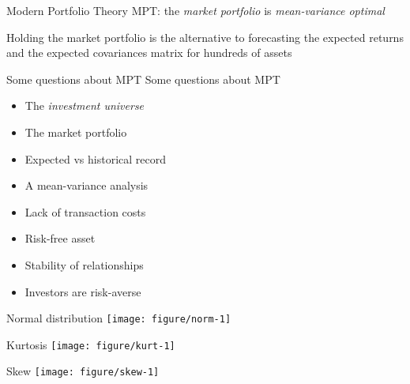\documentclass[14pt,xcolor=pdftex,dvipsnames,table]{beamer}\usepackage[]{graphicx}\usepackage[]{color}
\makeatletter
\def\maxwidth{ %
  \ifdim\Gin@nat@width>\linewidth
    \linewidth
  \else
    \Gin@nat@width
  \fi
}
\newenvironment{knitrout}{}{} %
\makeatother
\begin{document}
\begin{frame}{Modern Portfolio Theory}
MPT: the \emph{market portfolio} is \emph{mean-variance optimal}
\pause
\vspace{1cm}
\begin{block}{}
Holding the market portfolio is the alternative to forecasting the expected returns and the expected covariances matrix for hundreds of assets
\end{block}
\end{frame}

\begin{frame}{Some questions about MPT}
Some questions about MPT
\begin{itemize}[<+-| alert@+>]
\pause
\item The \emph{investment universe}
\item The market portfolio
\item Expected vs historical record
\item A mean-variance analysis
\item Lack of transaction costs
\item Risk-free asset
\item Stability of relationships
\item Investors are risk-averse
\end{itemize}
\end{frame}

\begin{frame}{Normal distribution}
\begin{knitrout}
\color{fgcolor}
\texttt{[image: figure/norm-1]} 

\end{knitrout}
\end{frame}

\begin{frame}{Kurtosis}
\begin{knitrout}
\color{fgcolor}
\texttt{[image: figure/kurt-1]} 

\end{knitrout}
\end{frame}

\begin{frame}{Skew}
\begin{knitrout}
\color{fgcolor}
\texttt{[image: figure/skew-1]} 

\end{knitrout}
\end{frame}
\end{document}
